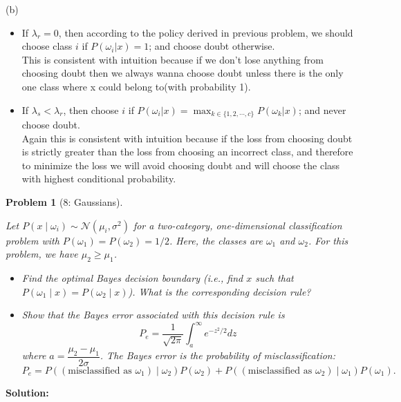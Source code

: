 \documentclass[11pt]{exam}
\theoremstyle{quest}
\newtheorem*{question}{Problem}
\begin{document}
(b)
\begin{itemize}
\item  If $\lambda_r = 0$, then according to the policy derived in previous problem, we should choose class $i$ if $P(\omega_i|x) = 1$; and choose doubt otherwise. \\
This is consistent with intuition because if we don't lose anything from choosing doubt then we always wanna choose doubt unless there is the only one class where x could belong to(with probability 1).
\item  If $\lambda_s < \lambda_r$, then choose $i$ if $P(\omega_i |x) = \max_{k \in \{ 1,2,\cdots,c \}} P(\omega_k |x)$; and never choose doubt.\\
Again this is consistent with intuition because if the loss from choosing doubt is strictly greater than the loss from choosing an incorrect class, and therefore to minimize the loss we will avoid choosing doubt and will choose the class with highest conditional probability.
\end{itemize}

\newpage

\begin{question}[8: Gaussians]
~

Let $P(x \mid \omega_i) \sim \mathcal{N}(\mu_i,\sigma^2)$ for a two-category, one-dimensional classification problem with $P(\omega_1)=P(\omega_2)=1/2$. Here, the classes are $\omega_{1}$ and $\omega_{2}$. For this problem, we have $\mu_{2} \geq \mu_{1}$.
\begin{itemize}
\item[(a)] Find the optimal Bayes decision boundary (i.e., find $x$ such that $P(\omega_{1} \mid x) = P(\omega_{2} \mid x)$). What is the corresponding decision rule?
\item[(b)] Show that the Bayes error associated with this decision rule is
\begin{equation*}
P_e=\frac{1}{\sqrt{2\pi}}\int_{a}^{\infty} e^{-z^{2}/2}dz
\end{equation*}
where $a=\dfrac{\mu_2 - \mu_1}{2\sigma}$. The Bayes error is the probability of misclassification: $$P_{e} = P((\text{misclassified as }\omega_{1}) \mid \omega_{2}) P(\omega_{2}) + P((\text{misclassified as }\omega_{2}) \mid \omega_{1}) P(\omega_{1}).$$
\end{itemize}
\end{question}
\textbf{Solution:}
\end{document}
